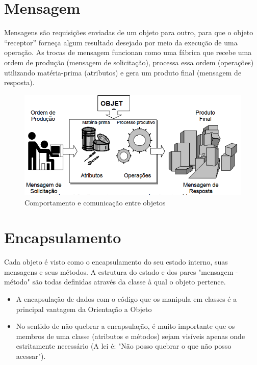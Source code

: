 \section{Mensagem}

Mensagens são requisições enviadas de um objeto para outro, para que o objeto ``receptor'' forneça algum resultado desejado por meio da execução de uma operação. As trocas de mensagem funcionan como uma fábrica que
recebe uma ordem de produção (mensagem de solicitação), processa essa ordem (operações) utilizando matéria-prima (atributos) e gera um produto final (mensagem de resposta).

\begin{figure}[H]
  \centering
  \includegraphics[scale=0.5]{imagens/analogia-mensagens.png}
  \caption{Comportamento e comunicação entre objetos}
  \label{}
\end{figure}

\section{Encapsulamento}

Cada objeto é visto como o encapsulamento do seu estado interno, suas mensagens e seus métodos. A estrutura do estado e dos pares "mensagem - método" são todas definidas através da classe à qual o objeto pertence.

\begin{itemize}
  \item A encapsulação de dados com o código que os manipula em classes é a principal vantagem da Orientação a Objeto
  \item No sentido de não quebrar a encapsulação, é muito importante que os membros de uma classe (atributos e métodos) sejam visíveis apenas onde estritamente necessário (A lei é: "Não posso quebrar o que não posso acessar").
\end{itemize}

